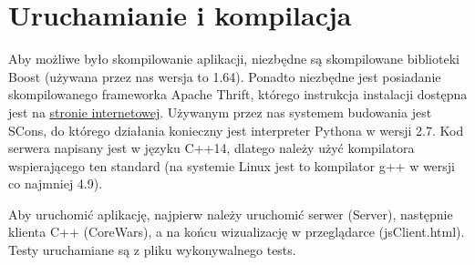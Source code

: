 \chapter{Uruchamianie i kompilacja}
Aby możliwe było skompilowanie aplikacji, niezbędne są skompilowane biblioteki Boost (używana przez nas wersja to 1.64). Ponadto niezbędne jest posiadanie skompilowanego frameworka Apache Thrift, którego instrukcja instalacji dostępna jest na \href{https://thrift.apache.org/}{stronie internetowej}. Używanym przez nas systemem budowania jest SCons, do którego działania konieczny jest interpreter Pythona w wersji 2.7.
Kod serwera napisany jest w języku C++14, dlatego należy użyć kompilatora wspierającego ten standard (na systemie Linux jest to kompilator g++ w wersji co najmniej 4.9).

Aby uruchomić aplikację, najpierw należy uruchomić serwer (Server), następnie klienta C++ (CoreWars), a na końcu wizualizację w przeglądarce (jsClient.html). Testy uruchamiane są z pliku wykonywalnego tests.